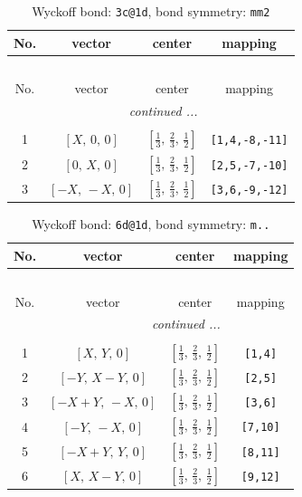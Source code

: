 \documentclass[fleqn,8pt]{jsarticle}
\begin{document}
\renewcommand{\arraystretch}{1.2}
\begin{longtable}{cccc}
\caption{Wyckoff bond: {\tt 3c@1d}, bond symmetry: {\tt mm2}}
 \\
 \hline \hline
No. & vector & center & mapping \\ \hline \endfirsthead

\multicolumn{3}{l}{\tablename\ \thetable{}} \\
 \hline \hline
No. & vector & center & mapping \\ \hline \endhead

 \hline \hline
\multicolumn{3}{r}{\footnotesize\it continued ...} \\ \endfoot

 \hline \hline
\multicolumn{3}{r}{} \\ \endlastfoot

1 & $\left[ X,\, 0,\, 0 \right]$ & $\left[ \frac{1}{3},\, \frac{2}{3},\, \frac{1}{2} \right]$ & {\tt [1,4,-8,-11]} \\ \hline
2 & $\left[ 0,\, X,\, 0 \right]$ & $\left[ \frac{1}{3},\, \frac{2}{3},\, \frac{1}{2} \right]$ & {\tt [2,5,-7,-10]} \\ \hline
3 & $\left[ - X,\, - X,\, 0 \right]$ & $\left[ \frac{1}{3},\, \frac{2}{3},\, \frac{1}{2} \right]$ & {\tt [3,6,-9,-12]} \\
\end{longtable}
\renewcommand{\arraystretch}{1.2}
\begin{longtable}{cccc}
\caption{Wyckoff bond: {\tt 6d@1d}, bond symmetry: {\tt m..}}
 \\
 \hline \hline
No. & vector & center & mapping \\ \hline \endfirsthead

\multicolumn{3}{l}{\tablename\ \thetable{}} \\
 \hline \hline
No. & vector & center & mapping \\ \hline \endhead

 \hline \hline
\multicolumn{3}{r}{\footnotesize\it continued ...} \\ \endfoot

 \hline \hline
\multicolumn{3}{r}{} \\ \endlastfoot

1 & $\left[ X,\, Y,\, 0 \right]$ & $\left[ \frac{1}{3},\, \frac{2}{3},\, \frac{1}{2} \right]$ & {\tt [1,4]} \\ \hline
2 & $\left[ - Y,\, X - Y,\, 0 \right]$ & $\left[ \frac{1}{3},\, \frac{2}{3},\, \frac{1}{2} \right]$ & {\tt [2,5]} \\ \hline
3 & $\left[ - X + Y,\, - X,\, 0 \right]$ & $\left[ \frac{1}{3},\, \frac{2}{3},\, \frac{1}{2} \right]$ & {\tt [3,6]} \\ \hline
4 & $\left[ - Y,\, - X,\, 0 \right]$ & $\left[ \frac{1}{3},\, \frac{2}{3},\, \frac{1}{2} \right]$ & {\tt [7,10]} \\ \hline
5 & $\left[ - X + Y,\, Y,\, 0 \right]$ & $\left[ \frac{1}{3},\, \frac{2}{3},\, \frac{1}{2} \right]$ & {\tt [8,11]} \\ \hline
6 & $\left[ X,\, X - Y,\, 0 \right]$ & $\left[ \frac{1}{3},\, \frac{2}{3},\, \frac{1}{2} \right]$ & {\tt [9,12]} \\
\end{longtable}
\end{document}
